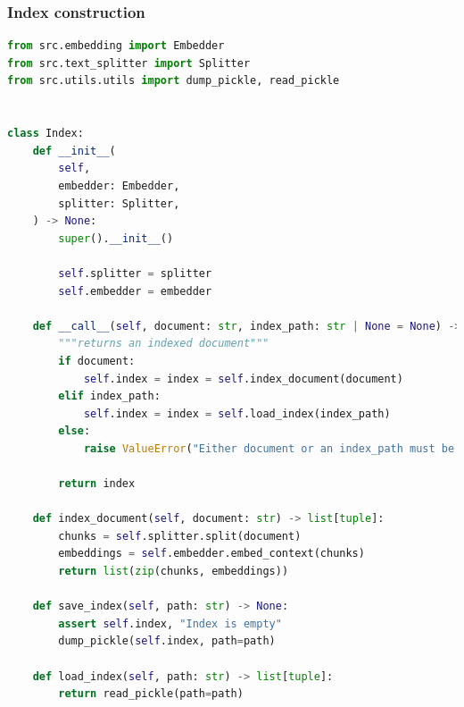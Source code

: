 \documentclass[a4paper,12pt]{article}
\begin{document}
\subsubsection{Index construction}
\begin{lstlisting}[language=python]
from src.embedding import Embedder
from src.text_splitter import Splitter
from src.utils.utils import dump_pickle, read_pickle


class Index:
    def __init__(
        self,
        embedder: Embedder,
        splitter: Splitter,
    ) -> None:
        super().__init__()

        self.splitter = splitter
        self.embedder = embedder

    def __call__(self, document: str, index_path: str | None = None) -> list[str]:
        """returns an indexed document"""
        if document:
            self.index = index = self.index_document(document)
        elif index_path:
            self.index = index = self.load_index(index_path)
        else:
            raise ValueError("Either document or an index_path must be provided")

        return index

    def index_document(self, document: str) -> list[tuple]:
        chunks = self.splitter.split(document)
        embeddings = self.embedder.embed_context(chunks)
        return list(zip(chunks, embeddings))

    def save_index(self, path: str) -> None:
        assert self.index, "Index is empty"
        dump_pickle(self.index, path=path)

    def load_index(self, path: str) -> list[tuple]:
        return read_pickle(path=path)
\end{lstlisting}
\end{document}
